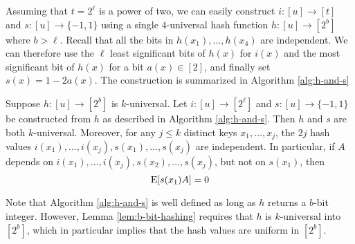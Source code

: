 Assuming that $t=2^\ell$ is a power of two, we can easily construct
$i:[u]\to[t]$ and $s:[u]\to\{-1,1\}$ using a single $4$-universal
hash function $h:[u]\to[2^b]$ where $b>\ell$. Recall that all the bits in
$h(x_1),\ldots,h(x_4)$ are independent. We can therefore use the
$\ell$ least significant bits of $h(x)$ for $i(x)$ and the most
significant bit of $h(x)$ for a bit $a(x)\in[2]$, and finally set
$s(x)=1-2a(x)$. The construction is summarized in Algorithm \ref{alg:h-and-s}
\begin{lemma}\label{lem:b-bit-hashing} Suppose $h:[u]\to[2^b]$ is $k$-universal. Let
   $i:[u]\to[2^\ell]$ and
   $s:[u]\to\{-1,1\}$ be constructed from $h$ as described in Algorithm \ref{alg:h-and-s}. Then $h$ and $s$ are both $k$-universal. Moreover, for
   any $j\leq k$ distinct keys $x_1,\ldots,x_j$, the $2j$ hash
   values $i(x_1),\ldots,i(x_j),s(x_1),\ldots,s(x_j)$ are independent.
   In particular, if $A$ depends on
   $i(x_1),\ldots,i(x_j),s(x_2),\ldots,s(x_j)$, but not on $s(x_1)$, then
   \begin{equation}\label{eq:E-0}
      \operatorname*{E}[s(x_1)A]=0
   \end{equation}
\end{lemma}
Note that Algorithm \ref{alg:h-and-s} is well defined as long as 
$h$ returns a $b$-bit integer. However, Lemma \ref{lem:b-bit-hashing} requires
that $h$ is $k$-universal into $[2^b]$, which in particular implies that
the hash values are uniform in $[2^b]$.


